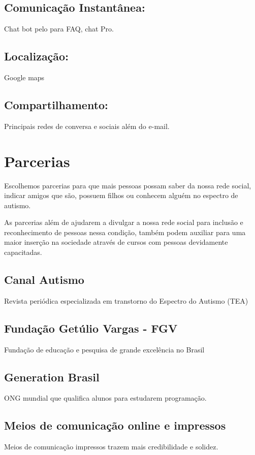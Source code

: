 \begin{apendicesenv}
	\subsection{Comunicação Instantânea:}
	Chat bot pelo para FAQ, chat Pro. 
	\subsection{Localização:}
	Google maps
	\subsection{Compartilhamento:}
	Principais redes de conversa e sociais além do e-mail. 
	
	\section{Parcerias}
	Escolhemos parcerias para que mais pessoas possam saber da nossa rede social, indicar amigos que são, possuem filhos ou conhecem alguém no espectro de autismo.
	
	As parcerias além de ajudarem a divulgar a nossa rede social para inclusão e reconhecimento de pessoas nessa condição, também podem auxiliar para uma maior inserção na sociedade através de cursos com pessoas devidamente capacitadas.
	
	\subsection{Canal Autismo}
	Revista periódica especializada em transtorno do Espectro do Autismo (TEA)
	
	\subsection{Fundação Getúlio Vargas - FGV}
	Fundação de educação e pesquisa de grande excelência no Brasil
	
	\subsection{Generation Brasil}
	ONG mundial que qualifica alunos para estudarem programação.
	
	\subsection{Meios de comunicação online e impressos}
	Meios de comunicação impressos trazem mais credibilidade e solidez.
	

\end{apendicesenv}

